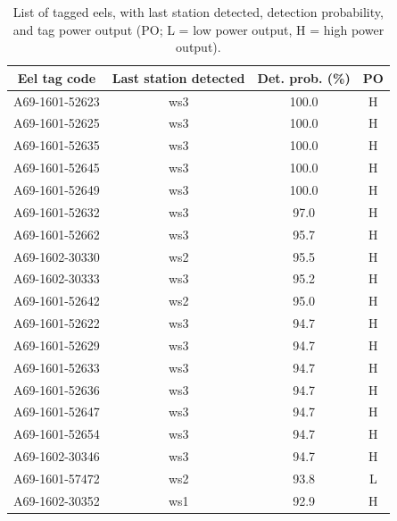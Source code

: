 \begin{table}
\centering
\scriptsize
\caption{List of tagged eels, with last station detected, detection probability, and tag power output (PO; L = low power output, H = high power output).}
\label{tag_list}
\begin{tabular}{|c|c|c|c|} 
\hline
Eel tag code            & Last station detected & Det. prob. (\%) & PO  \\ 
\hline
A69-1601-52623 & ws3                   & 100.0                & H   \\ 
\hline
A69-1601-52625 & ws3                   & 100.0                & H   \\ 
\hline
A69-1601-52635 & ws3                   & 100.0               & H   \\ 
\hline
A69-1601-52645 & ws3                   & 100.0                & H   \\ 
\hline
A69-1601-52649 & ws3                   & 100.0                & H   \\ 
\hline
A69-1601-52632 & ws3                   & 97.0                 & H   \\ 
\hline
A69-1601-52662 & ws3                   & 95.7                 & H   \\ 
\hline
A69-1602-30330 & ws2                   & 95.5                 & H   \\ 
\hline
A69-1602-30333 & ws3                   & 95.2                 & H   \\ 
\hline
A69-1601-52642 & ws2                   & 95.0                 & H   \\ 
\hline
A69-1601-52622 & ws3                   & 94.7                 & H   \\ 
\hline
A69-1601-52629 & ws3                   & 94.7                 & H   \\ 
\hline
A69-1601-52633 & ws3                   & 94.7                 & H   \\ 
\hline
A69-1601-52636 & ws3                   & 94.7                 & H   \\ 
\hline
A69-1601-52647 & ws3                   & 94.7                 & H   \\ 
\hline
A69-1601-52654 & ws3                   & 94.7                 & H   \\ 
\hline
A69-1602-30346 & ws3                   & 94.7                 & H   \\ 
\hline
A69-1601-57472 & ws2                   & 93.8                 & L   \\ 
\hline
A69-1602-30352 & ws1                   & 92.9                 & H   \\ 

\end{tabular}
\end{table}
